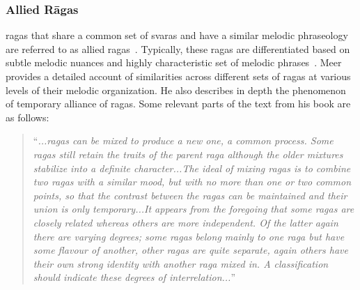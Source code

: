 \subsubsection{Allied R\={a}gas}
\label{sec:allied_ragas}

\Glspl{raga} that share a common set of \glspl{svara} and have a similar melodic phraseology are referred to as allied \glspl{raga}~\citep{krishna2012carnatic}. Typically, these \glspl{raga} are differentiated based on subtle melodic nuances and highly characteristic set of melodic phrases~\citep[p. 74-76]{meer1980hindustani}. Meer provides a detailed account of similarities across different sets of \glspl{raga} at various levels of their melodic organization. He also describes in depth the phenomenon of temporary alliance of \glspl{raga}. Some relevant parts of the text from his book are as follows: 

\blockquote{``\textit{...\Glspl{raga} can be mixed to produce a new one, a common process. Some \glspl{raga} still retain the traits of the parent \gls{raga} although the older mixtures stabilize into a definite character...The ideal of mixing \glspl{raga} is to combine two \glspl{raga} with a similar mood, but with no more than one or two common points, so that the contrast between the \glspl{raga} can be maintained and their union is only temporary...It appears from the foregoing that some \glspl{raga} are closely related whereas others are more independent. Of the latter again there are varying degrees; some \glspl{raga} belong mainly to one \gls{raga} but have some flavour of another, other \glspl{raga} are quite separate, again others have their own strong identity with another \gls{raga} mixed in. A classification should indicate these degrees of interrelation...}''}






